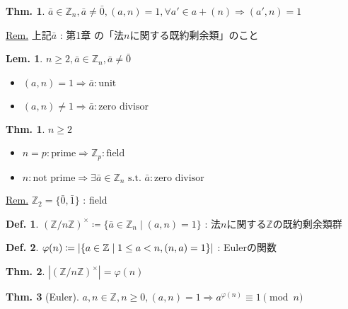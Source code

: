\documentclass[uplatex,dvipdfmx,9pt]{beamer}
\newcommand{\st}{\text{ s.t. }}
\newcommand{\lt}{\ensuremath <}
\newcommand{\Z}{\mathbb{Z}}
\newcounter{textThmCount}
\newcounter{textLemCount}
\theoremstyle{definition} %
\newtheorem{defn}{Def.}[subsection] %
\newtheorem{thm}{Thm.}[subsection] %
\newtheorem{thmText}[textThmCount]{Thm.}
\newtheorem{lemText}[textLemCount]{Lem.} %
\theoremstyle{example}
\begin{document}
    \begin{frame}

      \begin{thm}
        $\bar{a} \in \Z_n, \bar{a} \neq \bar{0}, (a, n) = 1, \forall a' \in a + (n) \Rightarrow (a', n) = 1$
      \end{thm}
      \underline{Rem.} 上記$\bar{a}$ : 第1章  の「法$n$に関する既約剰余類」のこと

      \begin{lemText}
        $n \ge 2, \bar{a} \in \Z_n, \bar{a} \neq \bar{0}$
        \begin{itemize}
          \item $(a, n) = 1 \Rightarrow \bar{a} : \text{unit}$
          \item $(a, n) \neq 1 \Rightarrow \bar{a} : \text{zero divisor}$
        \end{itemize}
      \end{lemText}

      \begin{thmText}
        $n \ge 2$
        \begin{itemize}
          \item $n = p : \text{prime} \Rightarrow \Z_p : \text{field}$
          \item $n : \text{not prime} \Rightarrow \exists \bar{a} \in \Z_n \st \bar{a} : \text{zero divisor}$
        \end{itemize}
      \end{thmText}
      \underline{Rem.} $\Z_2 = \{\bar{0}, \bar{1}\}$ : field

    \end{frame}

    \begin{frame}
 
      \begin{defn}
        $(\Z / n\Z)^\times \coloneqq \{\bar{a} \in \Z_n \mid (a, n) = 1\}$ : 法$n$に関する$\Z$の\alert{既約剰余類群}
      \end{defn}

      \begin{defn}
        $\varphi(n) \coloneqq |\{a \in \Z \mid 1 \le a \lt n, (n, a) = 1\}|$ : \alert{Eulerの関数}
      \end{defn}

      \begin{thm}
        $|(\Z / n\Z)^\times| = \varphi(n)$
      \end{thm}

      \begin{thm}[Euler]
        $a, n \in \Z, n \ge 0, (a, n) = 1 \Rightarrow a^{\varphi(n)} \equiv 1 \pmod{n}$
      \end{thm}

    \end{frame}
\end{document}
